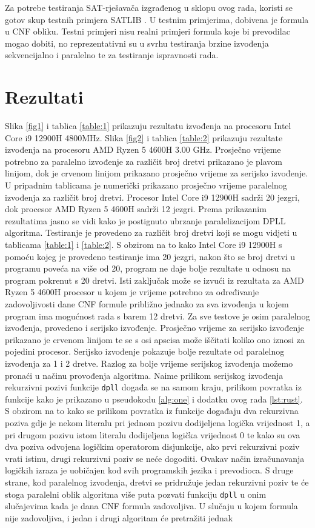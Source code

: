 \documentclass[hidelinks, conference]{IEEEtran}
\begin{document}
Za potrebe testiranja SAT-rješavača izgrađenog u sklopu ovog rada, koristi se gotov skup testnih primjera SATLIB \cite{b5}. U testnim primjerima, dobivena je formula u CNF obliku. Testni primjeri nisu realni primjeri formula koje bi prevodilac mogao dobiti, no reprezentativni su u svrhu testiranja brzine izvođenja sekvencijalno i paralelno te za testiranje ispravnosti rada.

\section{Rezultati}

Slika \ref{fig1} i tablica \ref{table:1} prikazuju rezultatu izvođenja na procesoru Intel Core i9 12900H 4800MHz. Slika \ref{fig2} i tablica \ref{table:2} prikazuju rezultate izvođenja na procesoru AMD Ryzen 5 4600H 3.00 GHz. Prosječno vrijeme potrebno za paralelno izvođenje za različit broj dretvi prikazano je plavom linijom, dok je crvenom linijom prikazano prosječno vrijeme za serijsko izvođenje. U pripadnim tablicama je numerički prikazano prosječno vrijeme paralelnog izvođenja za različit broj dretvi. Procesor Intel Core i9 12900H sadrži 20 jezgri, dok procesor AMD Ryzen 5 4600H sadrži 12 jezgri. Prema prikazanim rezultatima jasno se vidi kako je postignuto ubrzanje paralelizacijom DPLL algoritma. Testiranje je provedeno za različit broj dretvi koji se mogu vidjeti u tablicama \ref{table:1} i \ref{table:2}. S obzirom na to kako Intel Core i9 12900H s pomoću kojeg je provedeno testiranje ima 20 jezgri, nakon što se broj dretvi u programu poveća na više od 20, program ne daje bolje rezultate u odnosu na program pokrenut s 20 dretvi. Isti zaključak može se izvući iz rezultata za AMD Ryzen 5 4600H procesor u kojem je vrijeme potrebno za određivanje zadovoljivosti dane CNF formule približno jednako za sva izvođenja u kojem program ima mogućnost rada s barem 12 dretvi. Za sve testove je osim paralelnog izvođenja, provedeno i serijsko izvođenje. Prosječno vrijeme za serijsko izvođenje prikazano je crvenom linijom te se s osi apscisa može iščitati koliko ono iznosi za pojedini procesor. Serijsko izvođenje pokazuje bolje rezultate od paralelnog izvođenja za 1 i 2 dretve. Razlog za bolje vrijeme serijskog izvođenja možemo pronaći u načinu provođenja algoritma. Naime prilikom serijskog izvođenja rekurzivni pozivi funkcije \texttt{dpll} događa se na samom kraju, prilikom povratka iz funkcije kako je prikazano u pseudokodu \ref{alg:one} i dodatku ovog rada \ref{lst:rust}. S obzirom na to kako se prilikom povratka iz funkcije događaju dva rekurzivna poziva gdje je nekom literalu pri jednom pozivu dodijeljena logička vrijednost 1, a pri drugom pozivu istom literalu dodijeljena logička vrijednost 0 te kako su ova dva poziva odvojena logičkim operatorom disjunkcije, ako prvi rekurzivni poziv vrati istinu, drugi rekurzivni poziv se neće dogoditi. Ovakav način izračunavanja logičkih izraza je uobičajen kod svih programskih jezika i prevodioca. S druge strane, kod paralelnog izvođenja, dretvi se pridružuje jedan rekurzivni poziv te će stoga paralelni oblik algoritma više puta pozvati funkciju \texttt{dpll} u onim slučajevima kada je dana CNF formula zadovoljiva. U slučaju u kojem formula nije zadovoljiva, i jedan i drugi algoritam će pretražiti jednak 
\end{document}

